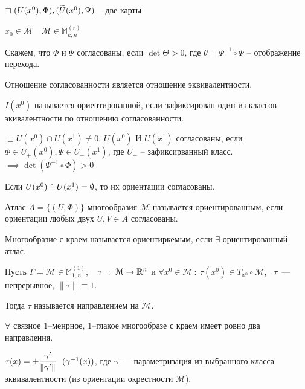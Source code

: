 \begin{definition}
    $\sqsupset (U(x^0), \Phi), (\widetilde{U}(x^0), \Psi)$ -- две карты

    $x_0\in \mathcal M\quad \mathcal M\in \mathbb M_{k, n}^{(r)}$

    Скажем, что $\Phi$ и $\Psi$ согласованы, если $\det \Theta >0$, где $\theta = \Psi^{-1}\circ\Phi$ -- отображение перехода.
\end{definition}

\begin{note}
    Отношение согласованности является отношение эквивалентности.
\end{note}

\begin{definition}
    $I(x^0)$ называется ориентированной, если зафиксирован один из классов экивалентности по отношению согласованности.
\end{definition}

\begin{note}
    $\sqsupset U(x^0) \cap U(x^1) \neq 0$. $U(x^0)$ И $U(x^1)$  согласованы, если $\Phi\in U_+(x^0), \Psi\in U_+(x^1)$, где $U_+$ -- зафиксирванный класс.
    $ \implies \det(\Psi^{-1}\circ\Phi) >0$

    Если $U(x^0) \cap U(x^1) = \emptyset $, то их ориентации согласованы.

    Атлас $A = \{(U, \Phi)\}$ многообразия $\mathcal M$ называется ориентированным, если ориентации любых двух $U, V\in A$ согласованы.

    Многообразие с краем называется ориентиркемым, если $\exists $ ориентированный атлас.
\end{note}

\begin{definition}
    Пусть $\Gamma = \mathcal{M} \in \mathbb{M}_{1, n}^{(1)}$, ~ $\tau ~:~ \mathcal M \to \mathbb{R}^n$ и $\forall x^0 \in \mathcal{M}~:~ \tau (x^0) \in T_{x^0} \circ \mathcal M$, ~$\tau$~--- непрерывное, $\|\tau\| \equiv 1$.

    Тогда $\tau$ называется направлением на $\mathcal M$.
\end{definition}


\begin{statement}
    $\forall $ связное $1$--менрное, $1$--глакое многообразе с краем имеет ровно два направления.

    $ \tau (x) =  \pm \dfrac{\gamma^{\prime}}{\| \gamma^{\prime} \|} ~~(\gamma ^{-1} (x))$, где $\gamma$~--- параметризация из выбранного класса эквивалентности (из ориентации окрестности $\mathcal{M}$).
\end{statement}


